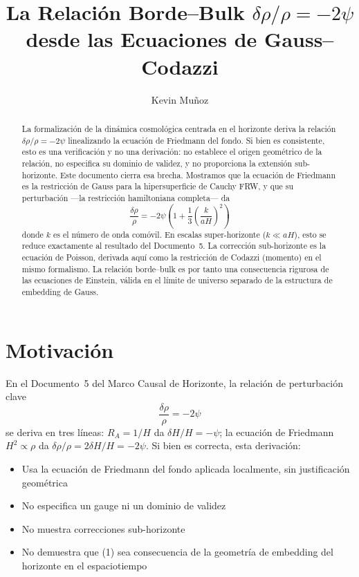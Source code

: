 \documentclass[12pt,a4paper]{article}
\title{La Relaci\'on Borde--Bulk $\delta\rho/\rho = -2\psi$ desde las Ecuaciones de Gauss--Codazzi}
\author{Kevin Mu\~noz}
\date{}
\begin{document}
\maketitle

\begin{abstract}
La formalización de la dinámica cosmológica centrada en el horizonte deriva la relación $\delta\rho/\rho = -2\psi$ linealizando la ecuación de Friedmann del fondo. Si bien es consistente, esto es una verificación y no una derivación: no establece el origen geométrico de la relación, no especifica su dominio de validez, y no proporciona la extensión sub-horizonte. Este documento cierra esa brecha. Mostramos que la ecuación de Friedmann es la restricción de Gauss para la hipersuperficie de Cauchy FRW, y que su perturbación ---la restricción hamiltoniana completa--- da
\[
\frac{\delta\rho}{\rho} = -2\psi\!\left(1 + \frac{1}{3}\left(\frac{k}{aH}\right)^2\right)
\]
donde $k$ es el número de onda comóvil. En escalas super-horizonte ($k \ll aH$), esto se reduce exactamente al resultado del Documento~5. La corrección sub-horizonte es la ecuación de Poisson, derivada aquí como la restricción de Codazzi (momento) en el mismo formalismo. La relación borde--bulk es por tanto una consecuencia rigurosa de las ecuaciones de Einstein, válida en el límite de universo separado de la estructura de embedding de Gauss.
\end{abstract}

\section{Motivación}

En el Documento~5 del Marco Causal de Horizonte, la relación de perturbación clave
\begin{equation}
\frac{\delta\rho}{\rho} = -2\psi \tag{1}
\end{equation}
se deriva en tres líneas: $R_A = 1/H$ da $\delta H/H = -\psi$; la ecuación de Friedmann $H^2 \propto \rho$ da $\delta\rho/\rho = 2\delta H/H = -2\psi$. Si bien es correcta, esta derivación:

\begin{itemize}
  \item Usa la ecuación de Friedmann del fondo aplicada localmente, sin justificación geométrica
  \item No especifica un gauge ni un dominio de validez
  \item No muestra correcciones sub-horizonte
  \item No demuestra que (1) sea consecuencia de la geometría de embedding del horizonte en el espaciotiempo
\end{itemize}
\end{document}
